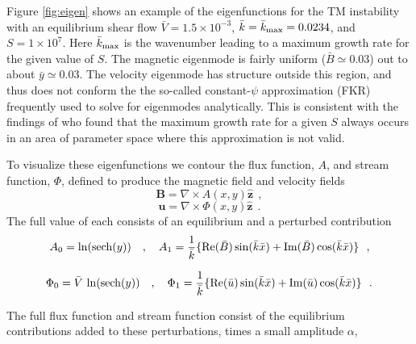 	Figure \ref{fig:eigen} shows an example of the eigenfunctions for the TM instability with an equilibrium shear flow $\bar{V} = 1.5 \times 10^{-3}$, $\bar{k}=\bar{k}_{\rm max}=0.0234$, and $S = 1\times 10^7$.  Here $\bar{k}_{\rm max}$ is the wavenumber leading to a maximum growth rate for the given value of $S$.  The magnetic eigenmode is fairly uniform 
($\bar{B}\simeq0.03$) out to about $\bar{y}\simeq0.03$.  The velocity eigenmode has structure outside this region, and thus does not conform the the so-called constant-$\psi$ approximation (FKR) frequently used to solve for eigenmodes analytically. This is consistent with the findings of \citet{Steinolfson1983} who found that the maximum growth rate for a given $S$ always occurs in an area of parameter space where this approximation is not valid.
	
	To visualize these eigenfunctions we contour the flux function, $A$, and stream function, $\Phi$, defined to produce the magnetic field and velocity fields
	\begin{equation}	
	 \mathbf{B} = \nabla \times A(x,y) \mathbf{\hat{z}}~~,
	 \end{equation}
\begin{equation}	
	 \mathbf{u} = \nabla \times \Phi(x,y)\mathbf{\hat{z}}~~.
	 \end{equation}
The full value of each consists of an equilibrium and a perturbed contribution
	 \begin{equation}
	 A_{0} = \ln(\operatorname{sech}(y)) \quad,\quad A_{1} = \frac{1}{\bar{k}}\lbrace \mathrm{Re}(\bar{B})\sin(\bar{k}\bar{x}) + \mathrm{Im}(\bar{B})\cos(\bar{k}\bar{x})\rbrace~~,
	\end{equation}	   
	

	 \begin{equation}
	 \Phi_{0} = \bar{V}\,\ln(\operatorname{sech}(y)) \quad,\quad \Phi_{1} = \frac{1}{\bar{k}}\lbrace \mathrm{Re}(\bar{u})\sin(\bar{k}\bar{x}) + \mathrm{Im}(\bar{u})\cos(\bar{k}\bar{x})\rbrace~~.
	\end{equation}

The full flux function and stream function consist of the equilibrium contributions added to these perturbations, times a small amplitude $\alpha$,
	
